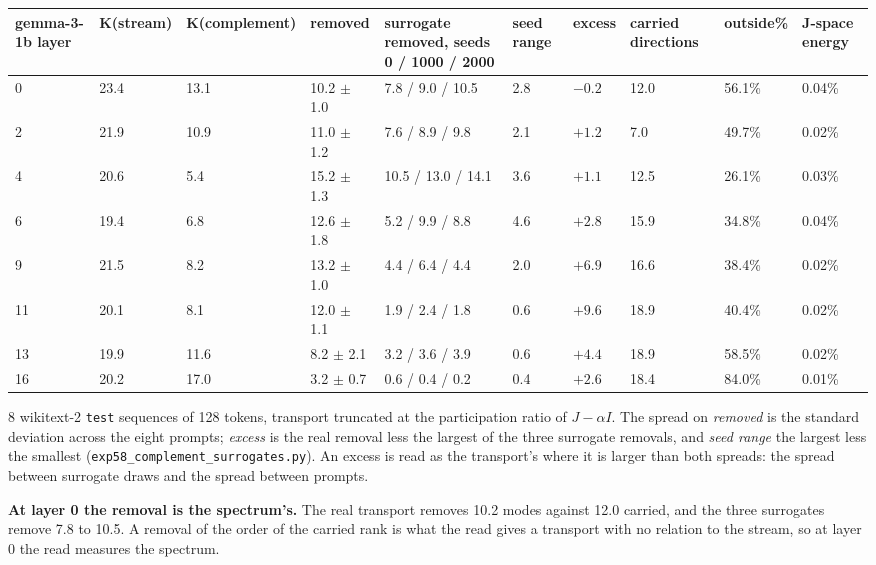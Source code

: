 \documentclass[10pt,letterpaper,twocolumn]{article}
\begin{document}
\begin{table}[tp]
\centering\footnotesize
\begin{tabular}{L{0.083\textwidth}L{0.075\textwidth}L{0.108\textwidth}L{0.076\textwidth}L{0.155\textwidth}L{0.071\textwidth}L{0.050\textwidth}L{0.084\textwidth}L{0.067\textwidth}L{0.064\textwidth}}
\toprule
gemma-3-1b layer & K(stream) & K(complement) & removed & surrogate removed, seeds 0 / 1000 / 2000 & seed range & excess & carried directions & outside\% & J-space energy \\
 & 23.4 & 13.1 & 10.2 \(\pm\) 1.0 & 7.8 / 9.0 / 10.5 & 2.8 & \(-0.2\) & 12.0 & 56.1\% & 0.04\% \\
2 & 21.9 & 10.9 & 11.0 \(\pm\) 1.2 & 7.6 / 8.9 / 9.8 & 2.1 & \(+1.2\) & 7.0 & 49.7\% & 0.02\% \\
4 & 20.6 & 5.4 & 15.2 \(\pm\) 1.3 & 10.5 / 13.0 / 14.1 & 3.6 & \(+1.1\) & 12.5 & 26.1\% & 0.03\% \\
6 & 19.4 & 6.8 & 12.6 \(\pm\) 1.8 & 5.2 / 9.9 / 8.8 & 4.6 & \(+2.8\) & 15.9 & 34.8\% & 0.04\% \\
9 & 21.5 & 8.2 & 13.2 \(\pm\) 1.0 & 4.4 / 6.4 / 4.4 & 2.0 & \(+6.9\) & 16.6 & 38.4\% & 0.02\% \\
11 & 20.1 & 8.1 & 12.0 \(\pm\) 1.1 & 1.9 / 2.4 / 1.8 & 0.6 & \(+9.6\) & 18.9 & 40.4\% & 0.02\% \\
13 & 19.9 & 11.6 & 8.2 \(\pm\) 2.1 & 3.2 / 3.6 / 3.9 & 0.6 & \(+4.4\) & 18.9 & 58.5\% & 0.02\% \\
16 & 20.2 & 17.0 & 3.2 \(\pm\) 0.7 & 0.6 / 0.4 / 0.2 & 0.4 & \(+2.6\) & 18.4 & 84.0\% & 0.01\% \\
\bottomrule
\end{tabular}
\end{table}

8 wikitext-2 \texttt{test} sequences of 128 tokens, transport truncated at the participation ratio of
\(J-\alpha I\). The spread on \emph{removed} is the standard deviation across the eight prompts; \emph{excess}
is the real removal less the largest of the three surrogate removals, and \emph{seed range} the largest
less the smallest (\texttt{exp58\_\allowbreak{}complement\_\allowbreak{}surrogates.\allowbreak{}py}). An excess is read as the transport's where it
is larger than both spreads: the spread between surrogate draws and the spread between prompts.

\textbf{At layer 0 the removal is the spectrum's.} The real transport removes 10.2 modes against 12.0
carried, and the three surrogates remove 7.8 to 10.5. A removal of the order of the carried rank is
what the read gives a transport with no relation to the stream, so at layer 0 the read measures
the spectrum.
\end{document}
